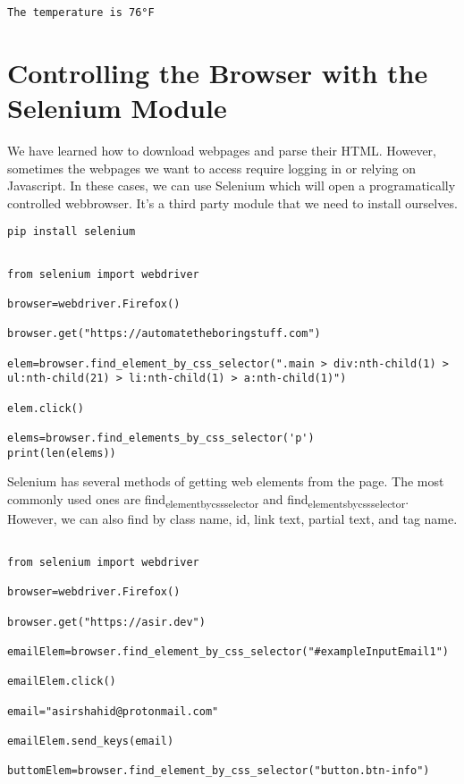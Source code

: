 \documentclass[11pt]{article}
\begin{document}
\begin{verbatim}
The temperature is 76°F
\end{verbatim}
\section{Controlling the Browser with the Selenium Module}
\label{sec:org27c0262}

We have learned how to download webpages and parse their HTML. However, sometimes the webpages we want to access require logging in or relying on Javascript. In these cases, we can use Selenium which will open a programatically controlled webbrowser. It's a third party module that we need to install ourselves.

\begin{verbatim}
pip install selenium
\end{verbatim}

\begin{verbatim}

from selenium import webdriver

browser=webdriver.Firefox()

browser.get("https://automatetheboringstuff.com")

elem=browser.find_element_by_css_selector(".main > div:nth-child(1) > ul:nth-child(21) > li:nth-child(1) > a:nth-child(1)")

elem.click()

elems=browser.find_elements_by_css_selector('p')
print(len(elems))

\end{verbatim}

Selenium has several methods of getting web elements from the page. The most commonly used ones are find\textsubscript{element}\textsubscript{by}\textsubscript{css}\textsubscript{selector} and find\textsubscript{elements}\textsubscript{by}\textsubscript{css}\textsubscript{selector}. However, we can also find by class name, id, link text, partial text, and tag name.

\begin{verbatim}

from selenium import webdriver

browser=webdriver.Firefox()

browser.get("https://asir.dev")

emailElem=browser.find_element_by_css_selector("#exampleInputEmail1")

emailElem.click()

email="asirshahid@protonmail.com"

emailElem.send_keys(email)

buttomElem=browser.find_element_by_css_selector("button.btn-info")



\end{verbatim}
\end{document}
